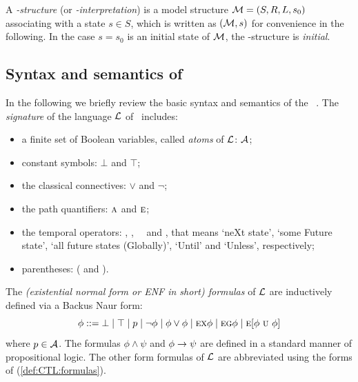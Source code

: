 \documentclass{article}
\begin{document}
A {\em \MPK-structure} (or {\em \MPK-interpretation}) is a model structure
${\cal M}=(S, R, L, s_0)$ associating
with a state $s\in S$, which is written as $({\cal M},s)$ for convenience in the following.
In the case $s=s_0$ is an initial state of $\cal M$, the \MPK-structure is {\em initial}.



\subsection{Syntax and semantics of \CTL}
In the following we briefly review the basic syntax and semantics
of the \CTL~\cite{DBLP:journals/toplas/ClarkeES86}.
The {\em signature} of the language $\cal L$ of \CTL\ includes:
\begin{itemize}
  \item a finite set of Boolean variables, called {\em atoms} of $\cal L$: $\cal A$;
  \item constant symbols: $\bot$ and $\top$;
  \item the classical connectives: $\lor$ and $\neg$;
  \item the path quantifiers: $\textsc{a}$ and $\textsc{e}$;
  \item the temporal operators: \NEXT, \FUTURE, \GLOBAL\, \UNTIL\ and \UNLESS, that
  means `neXt state', `some Future state', `all future states (Globally)', `Until' and `Unless', respectively;
  \item parentheses: ( and ).
\end{itemize}

The {\em (existential normal form or ENF in short) formulas} of
$\cal L$ are inductively defined via a Backus Naur form:
\begin{equation}\label{def:CTL:formulas}
  \phi ::=  \bot \mid \top \mid p \mid\neg\phi \mid \phi\lor\phi \mid
    \EXIST \NEXT \phi \mid
    \EXIST \GLOBAL \phi \mid
    \EXIST [\phi\ \UNTIL\ \phi]%
\end{equation}
where $p\in\cal A$. The formulas $\phi\land\psi$ and $\phi\rightarrow\psi$
are defined in a standard manner of propositional logic.
The other form formulas of $\cal L$ are abbreviated
using the forms of (\ref{def:CTL:formulas}).
\end{document}
